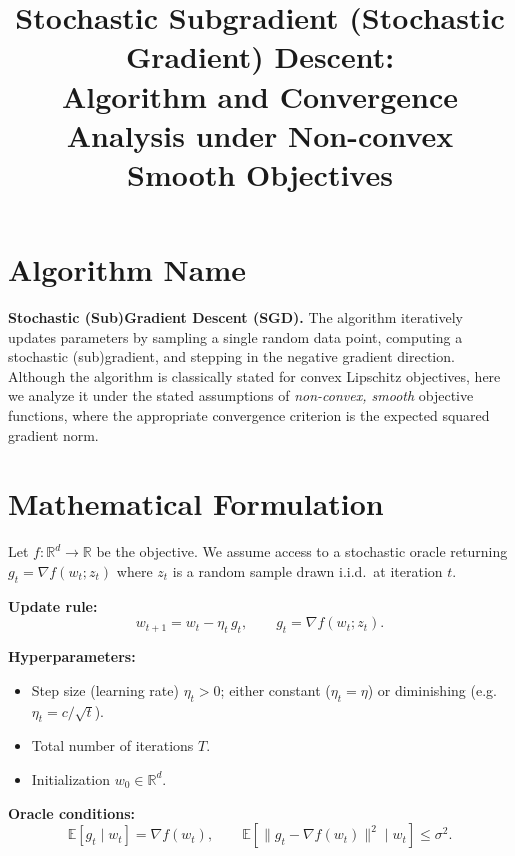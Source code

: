 \documentclass[11pt]{article}
\title{Stochastic Subgradient (Stochastic Gradient) Descent:\\
Algorithm and Convergence Analysis under Non-convex Smooth Objectives}
\author{}
\date{}
\begin{document}
\maketitle

\section*{Algorithm Name}
\textbf{Stochastic (Sub)Gradient Descent (SGD).}
The algorithm iteratively updates parameters by sampling a single random
data point, computing a stochastic (sub)gradient, and stepping in the
negative gradient direction. Although the algorithm is classically stated
for convex Lipschitz objectives, here we analyze it under the stated
assumptions of \emph{non-convex, smooth} objective functions, where the
appropriate convergence criterion is the expected squared gradient norm.

\section*{Mathematical Formulation}
Let $f:\mathbb{R}^d\to\mathbb{R}$ be the objective. We assume access to a
stochastic oracle returning $g_t=\nabla f(w_t;z_t)$ where $z_t$ is a random
sample drawn i.i.d.\ at iteration $t$.

\textbf{Update rule:}
\[
w_{t+1} = w_t - \eta_t\, g_t,\qquad g_t=\nabla f(w_t;z_t).
\]

\textbf{Hyperparameters:}
\begin{itemize}
  \item Step size (learning rate) $\eta_t>0$; either constant ($\eta_t=\eta$)
        or diminishing (e.g.\ $\eta_t=c/\sqrt{t}$).
  \item Total number of iterations $T$.
  \item Initialization $w_0\in\mathbb{R}^d$.
\end{itemize}

\textbf{Oracle conditions:}
\[
\mathbb{E}[g_t\mid w_t]=\nabla f(w_t),\qquad
\mathbb{E}\!\left[\|g_t-\nabla f(w_t)\|^2\mid w_t\right]\le\sigma^2.
\]

\end{document}
